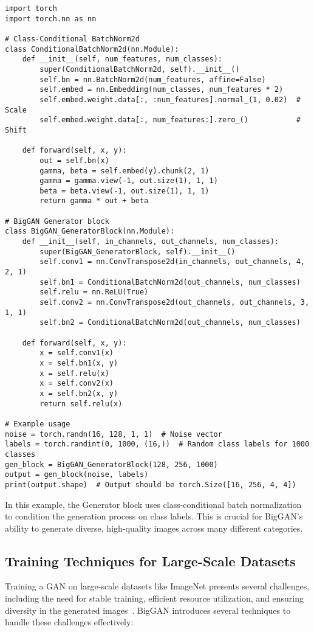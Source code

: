 \begin{lstlisting}[style=python]
import torch
import torch.nn as nn

# Class-Conditional BatchNorm2d
class ConditionalBatchNorm2d(nn.Module):
    def __init__(self, num_features, num_classes):
        super(ConditionalBatchNorm2d, self).__init__()
        self.bn = nn.BatchNorm2d(num_features, affine=False)
        self.embed = nn.Embedding(num_classes, num_features * 2)
        self.embed.weight.data[:, :num_features].normal_(1, 0.02)  # Scale
        self.embed.weight.data[:, num_features:].zero_()           # Shift

    def forward(self, x, y):
        out = self.bn(x)
        gamma, beta = self.embed(y).chunk(2, 1)
        gamma = gamma.view(-1, out.size(1), 1, 1)
        beta = beta.view(-1, out.size(1), 1, 1)
        return gamma * out + beta

# BigGAN Generator block
class BigGAN_GeneratorBlock(nn.Module):
    def __init__(self, in_channels, out_channels, num_classes):
        super(BigGAN_GeneratorBlock, self).__init__()
        self.conv1 = nn.ConvTranspose2d(in_channels, out_channels, 4, 2, 1)
        self.bn1 = ConditionalBatchNorm2d(out_channels, num_classes)
        self.relu = nn.ReLU(True)
        self.conv2 = nn.ConvTranspose2d(out_channels, out_channels, 3, 1, 1)
        self.bn2 = ConditionalBatchNorm2d(out_channels, num_classes)
    
    def forward(self, x, y):
        x = self.conv1(x)
        x = self.bn1(x, y)
        x = self.relu(x)
        x = self.conv2(x)
        x = self.bn2(x, y)
        return self.relu(x)

# Example usage
noise = torch.randn(16, 128, 1, 1)  # Noise vector
labels = torch.randint(0, 1000, (16,))  # Random class labels for 1000 classes
gen_block = BigGAN_GeneratorBlock(128, 256, 1000)
output = gen_block(noise, labels)
print(output.shape)  # Output should be torch.Size([16, 256, 4, 4])
\end{lstlisting}

In this example, the Generator block uses class-conditional batch normalization to condition the generation process on class labels. This is crucial for BigGAN's ability to generate diverse, high-quality images across many different categories.

\subsection{Training Techniques for Large-Scale Datasets}
Training a GAN on large-scale datasets like ImageNet presents several challenges, including the need for stable training, efficient resource utilization, and ensuring diversity in the generated images~\cite{donahue2019large}. BigGAN introduces several techniques to handle these challenges effectively:

